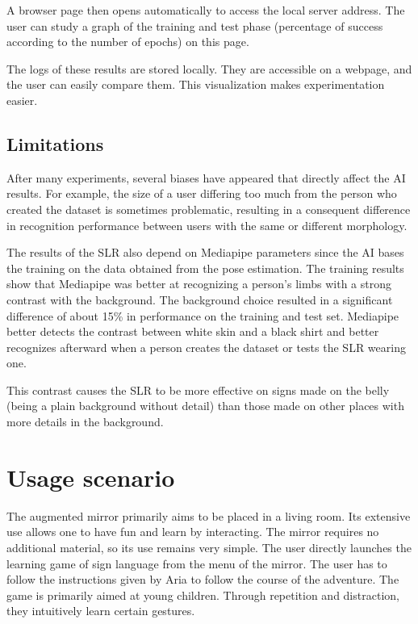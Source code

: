 A browser page then opens automatically to access the local server address. The user can study a graph of the training and test phase (percentage of success according to the number of epochs) on this page. 

The logs of these results are stored locally. They are accessible on a webpage, and the user can easily compare them. This visualization makes experimentation easier.

\subsection{Limitations}

After many experiments, several biases have appeared that directly affect the AI results. For example, the size of a user differing too much from the person who created the dataset is sometimes problematic, resulting in a consequent difference in recognition performance between users with the same or different morphology. 

The results of the SLR also depend on Mediapipe parameters since the AI bases the training on the data obtained from the pose estimation. The training results show that Mediapipe was better at recognizing a person's limbs with a strong contrast with the background. The background choice resulted in a significant difference of about 15\% in performance on the training and test set. Mediapipe better detects the contrast between white skin and a black shirt and better recognizes afterward when a person creates the dataset or tests the SLR wearing one. 

This contrast causes the SLR to be more effective on signs made on the belly (being a plain background without detail) than those made on other places with more details in the background.

\section{Usage scenario}

The augmented mirror primarily aims to be placed in a living room. Its extensive use allows one to have fun and learn by interacting.
The mirror requires no additional material, so its use remains very simple.
The user directly launches the learning game of sign language from the menu of the mirror. The user has to follow the instructions given by Aria to follow the course of the adventure. The game is primarily aimed at young children. Through repetition and distraction, they intuitively learn certain gestures.


